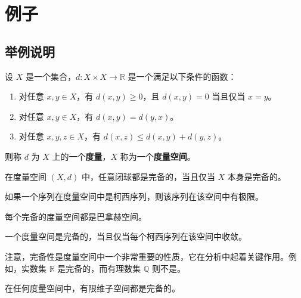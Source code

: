 \documentclass[12pt, a4paper, oneside, UTF8]{ctexbook}
\begin{document}
	\else
	\fi
	\chapter{例子}
	
	\section{举例说明}
	
	\begin{defn}
		设 $X$ 是一个集合，$d: X \times X \to \mathbb{R}$ 是一个满足以下条件的函数：
		\begin{enumerate}
			\item 对任意 $x, y \in X$，有 $d(x, y) \geq 0$，且 $d(x, y) = 0$ 当且仅当 $x = y$。
			\item 对任意 $x, y \in X$，有 $d(x, y) = d(y, x)$。
			\item 对任意 $x, y, z \in X$，有 $d(x, z) \leq d(x, y) + d(y, z)$。
		\end{enumerate}
		则称 $d$ 为 $X$ 上的一个\textbf{度量}，$X$ 称为一个\textbf{度量空间}。
	\end{defn}
	
	\begin{thm}
		在度量空间 $(X, d)$ 中，任意闭球都是完备的，当且仅当 $X$ 本身是完备的\cite{choy20194ds}。
	\end{thm}
	
	\begin{lemma}
		如果一个序列在度量空间中是柯西序列，则该序列在该空间中有极限。
	\end{lemma}
	
	\begin{corollary}
		每个完备的度量空间都是巴拿赫空间。
	\end{corollary}
	
	\begin{criterion}
		一个度量空间是完备的，当且仅当每个柯西序列在该空间中收敛。
	\end{criterion}
	
	\begin{rmk}
		注意，完备性是度量空间中一个非常重要的性质，它在分析中起着关键作用。例如，实数集 $\mathbb{R}$ 是完备的，而有理数集 $\mathbb{Q}$ 则不是。
	\end{rmk}
	
	\begin{proposition}
		在任何度量空间中，有限维子空间都是完备的。
	\end{proposition}
	
\end{document}
